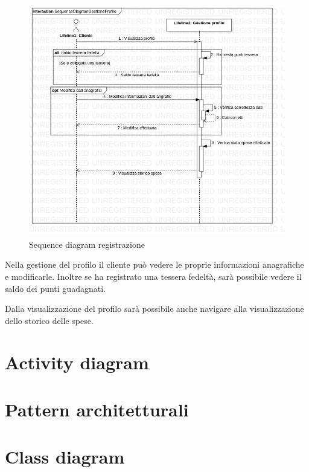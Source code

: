 \documentclass[12pt, a4paper]{article}
\numberwithin{equation}{section} %
\begin{document}
\begin{figure}[ht]
\centering
\includegraphics[width=\textwidth]{Use Case Model!Gestione profilo!InteractionGestioneProfilo!SequenceDiagramGestioneProfilo_5.png}
\caption{Sequence diagram registrazione}
\end{figure}

Nella gestione del profilo il cliente può vedere le proprie informazioni 
anagrafiche e modificarle. Inoltre se ha registrato una tessera fedeltà, sarà
possibile vedere il saldo dei punti guadagnati.

Dalla visualizzazione del profilo sarà possibile anche navigare alla
visualizzazione dello storico delle spese.

\newpage

\section{Activity diagram}


\section{Pattern architetturali}


\section{Class diagram}
\end{document}
